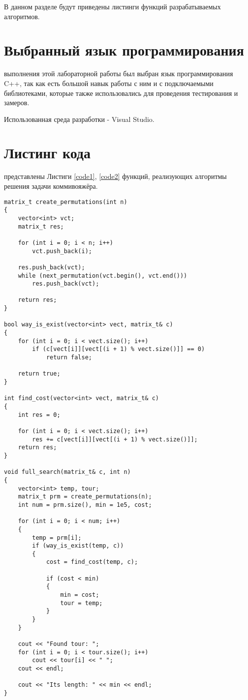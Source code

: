 В данном разделе будут приведены листинги функций разрабатываемых алгоритмов.

\section{Выбранный язык программирования}
 выполнения этой лабораторной работы был выбран язык программирования C++, так как есть большой навык работы с ним и с подключаемыми библиотеками, которые также использовались для проведения тестирования и замеров. \cite{c_plus_plus}

Использованная среда разработки - Visual Studio. \cite{Visual}

\section{Листинг кода}
 представлены Листиги \ref{code1}, \ref{code2} функций, реализующих алгоритмы решения задачи коммивояжёра.

\begin{lstlisting}[label=code1, caption = Алгоритм полного перебора]
matrix_t create_permutations(int n)
{
	vector<int> vct;
	matrix_t res;
	
	for (int i = 0; i < n; i++)
		vct.push_back(i);
	
	res.push_back(vct);
	while (next_permutation(vct.begin(), vct.end()))
		res.push_back(vct);
	
	return res;
}

bool way_is_exist(vector<int> vect, matrix_t& c)
{
	for (int i = 0; i < vect.size(); i++)
		if (c[vect[i]][vect[(i + 1) % vect.size()]] == 0)
			return false;
	
	return true;
}

int find_cost(vector<int> vect, matrix_t& c)
{
	int res = 0;
	
	for (int i = 0; i < vect.size(); i++)
		res += c[vect[i]][vect[(i + 1) % vect.size()]];
	return res;
}

void full_search(matrix_t& c, int n)
{
	vector<int> temp, tour;
	matrix_t prm = create_permutations(n);
	int num = prm.size(), min = 1e5, cost;
	
	for (int i = 0; i < num; i++)
	{
		temp = prm[i];
		if (way_is_exist(temp, c))
		{
			cost = find_cost(temp, c);
			
			if (cost < min)
			{
				min = cost;
				tour = temp;
			}
		}
	}
	
	cout << "Found tour: ";
	for (int i = 0; i < tour.size(); i++)
		cout << tour[i] << " ";
	cout << endl;
	
	cout << "Its length: " << min << endl;
}
\end{lstlisting}

